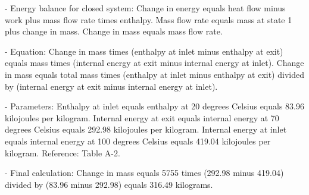 - Energy balance for closed system:  
  Change in energy equals heat flow minus work plus mass flow rate times enthalpy.  
  Mass flow rate equals mass at state 1 plus change in mass.  
  Change in mass equals mass flow rate.  

- Equation:  
  Change in mass times (enthalpy at inlet minus enthalpy at exit) equals mass times (internal energy at exit minus internal energy at inlet).  
  Change in mass equals total mass times (enthalpy at inlet minus enthalpy at exit) divided by (internal energy at exit minus internal energy at inlet).  

- Parameters:  
  Enthalpy at inlet equals enthalpy at 20 degrees Celsius equals 83.96 kilojoules per kilogram.  
  Internal energy at exit equals internal energy at 70 degrees Celsius equals 292.98 kilojoules per kilogram.  
  Internal energy at inlet equals internal energy at 100 degrees Celsius equals 419.04 kilojoules per kilogram.  
  Reference: Table A-2.  

- Final calculation:  
  Change in mass equals 5755 times (292.98 minus 419.04) divided by (83.96 minus 292.98) equals 316.49 kilograms.